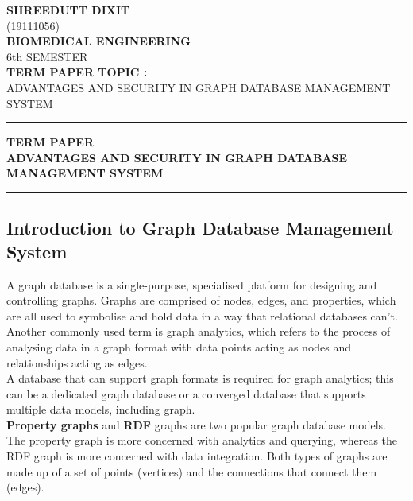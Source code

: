 \documentclass[12pt,a4paper]{article}
\begin{document}
    \vspace*{\fill}
    \begin{center}
        \Huge
        \textbf{SHREEDUTT DIXIT}
        \\
        \Large
        (19111056)
        \\
        \textbf{BIOMEDICAL ENGINEERING}
        \\
        6th SEMESTER
        \\
        \Large
        \textbf{TERM PAPER TOPIC :}
        \\
        \large
        ADVANTAGES AND SECURITY IN GRAPH DATABASE MANAGEMENT SYSTEM
    \end{center}
    \vspace*{\fill}
    \pagebreak
    
    \hrule \medskip 
    \begin{center}
        \large 
    \textbf{TERM PAPER}\\
    \normalsize 
    \textbf{ADVANTAGES AND SECURITY IN GRAPH DATABASE MANAGEMENT SYSTEM}\\ 
    \end{center}
    
    \medskip\hrule
    \bigskip
    
    \begin{center}
    \subsection*{Introduction to Graph Database Management System}
    \end{center}
    
    A graph database is a single-purpose, specialised platform for designing and controlling graphs. Graphs are comprised of nodes, edges, and properties, which are all used to symbolise and hold data in a way that relational databases can't.
    \\
    Another commonly used term is graph analytics, which refers to the process of analysing data in a graph format with data points acting as nodes and relationships acting as edges.
    \\
    A database that can support graph formats is required for graph analytics; this can be a dedicated graph database or a converged database that supports multiple data models, including graph.
    \\
    \textbf{Property graphs} and \textbf{RDF} graphs are two popular graph database models.
    \\
    The property graph is more concerned with analytics and querying, whereas the RDF graph is more concerned with data integration. Both types of graphs are made up of a set of points (vertices) and the connections that connect them (edges).
\pagebreak
\end{document}
